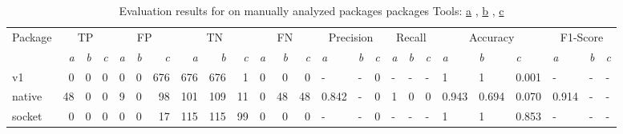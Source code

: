 \begin{table}[h]
    \centering
    \caption[Evaluation results for \toolSafer{} on manually analyzed packages packages]
        {Evaluation results for \toolSafer{} on manually analyzed packages packages \newline \footnotesize
        Tools: \underline{a} \toolSafer{}, \underline{b} \toolVet{}, \underline{c} \toolGosec{} \newline}
    \label{tbl:gosafer-evaluation-packages}
    \begin{adjustbox}{max width=\textwidth}
        \begin{tabular}{l||rrr|rrr|rrr|rrr||lll|lll|lll|lll}
            Package    & \multicolumn{3}{c|}{TP}                         & \multicolumn{3}{c|}{FP}                          & \multicolumn{3}{c|}{TN}                         & \multicolumn{3}{c||}{FN}                         & \multicolumn{3}{c|}{Precision}          & \multicolumn{3}{c|}{Recall}             & \multicolumn{3}{c|}{Accuracy}          & \multicolumn{3}{c}{F1-Score}           \\
            {}         & \textit{a}            & \textit{b} & \textit{c} & \textit{a}             & \textit{b} & \textit{c} & \textit{a}            & \textit{b} & \textit{c} & \textit{a}             & \textit{b} & \textit{c} & \textit{a}    & \textit{b} & \textit{c} & \textit{a}    & \textit{b} & \textit{c} & \textit{a}   & \textit{b} & \textit{c} & \textit{a}   & \textit{b} & \textit{c} \\
            \hline
            v1         & 0                     & 0          & 0          & 0                      & 0          & 676        & 676                   & 676        & 1          & 0                      & 0          & 0          & -             & -          & 0          & -             & -          & -          & 1            & 1          & 0.001      & -            & -          & -          \\
            native     & 48                    & 0          & 0          & 9                      & 0          & 98         & 101                   & 109        & 11         & 0                      & 48         & 48         & 0.842         & -          & 0          & 1             & 0          & 0          & 0.943        & 0.694      & 0.070      & 0.914        & -          & -          \\
            socket     & 0                     & 0          & 0          & 0                      & 0          & 17         & 115                   & 115        & 99         & 0                      & 0          & 0          & -             & -          & 0          & -             & -          & -          & 1            & 1          & 0.853      & -            & -          & -          \\

\end{tabular}
\end{adjustbox}
\end{table}
